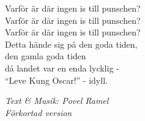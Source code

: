 \vspace{10pt}
Varför är där ingen is till punschen?\\
Varför är där ingen is till punschen?\\
Varför är där ingen is till punschen?\\
Detta hände sig på den goda tiden,\\
den gamla goda tiden\\
då landet var en enda lycklig -\\
``Leve Kung Oscar!'' - idyll.\par
\vspace{10pt}
{\footnotesize\textit{Text \& Musik: Povel Ramel\\Förkortad version}}

